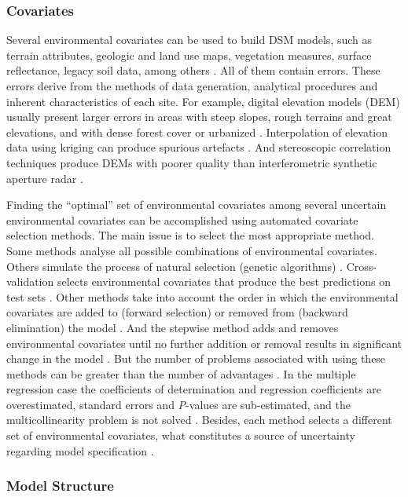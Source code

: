 \subsubsection*{Covariates}

Several environmental covariates can be used to build DSM models, such as 
terrain attributes, geologic and land use maps, vegetation measures, surface 
reflectance, legacy soil data, among others \cite{McBratneyEtAl2003}. All of 
them contain errors. These errors derive from the methods of data generation, 
analytical procedures and inherent characteristics of each site. For example, 
digital elevation models (DEM) usually present larger errors in areas with steep
slopes, rough terrains and great elevations, and with dense forest cover or 
urbanized \cite{Florinsky1998, Toutin2000, FisherEtAl2006}. Interpolation of 
elevation data using kriging can produce spurious artefacts \cite{HenglEtAl2009}.
And stereoscopic correlation techniques produce DEMs with poorer quality than 
interferometric synthetic aperture radar \cite{HirtEtAl2010}.

Finding the ``optimal'' set of environmental covariates among several uncertain
environmental covariates can be accomplished using automated covariate selection
methods. The main issue is to select the most appropriate method. Some methods 
analyse all possible combinations of environmental covariates. Others simulate 
the process of natural selection (genetic algorithms) \cite{AndersenEtAl2010}. 
Cross-validation selects environmental covariates that produce the best 
predictions on test sets \cite{GuyonEtAl2003}. Other methods take into account 
the order in which the environmental covariates are added to (forward selection)
or removed from (backward elimination) the model \cite{LarkEtAl2007a}. And the 
stepwise method adds and removes environmental covariates until no further 
addition or removal results in significant change in the model 
\cite{VenablesEtAl2002}. But the number of problems associated with using these 
methods can be greater than the number of advantages \cite{Chatfield1995, 
LarkEtAl2007a}. In the multiple regression case the coefficients of 
determination and regression coefficients are overestimated, standard errors 
and \textit{P}-values are sub-estimated, and the multicollinearity problem is 
not solved \cite{Harrell2001a}. Besides, each method selects a different set of
environmental covariates, what constitutes a source of uncertainty regarding 
model specification \cite{Harrell2001a}.

\subsubsection*{Model Structure}

